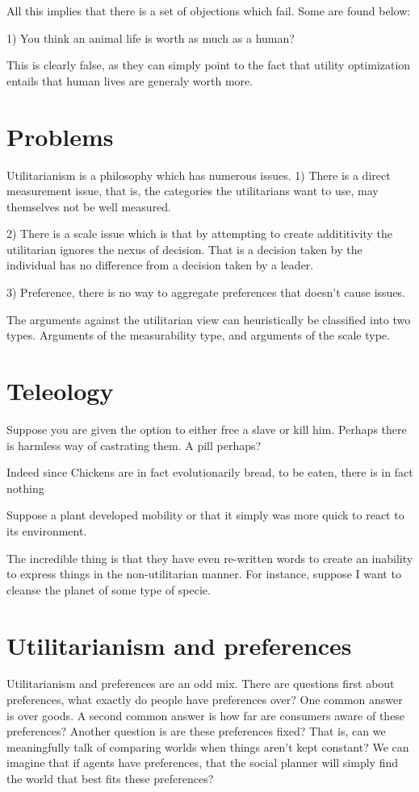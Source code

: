 \documentclass[12pt]{report}
\numberwithin{equation}{section}
\begin{document}
All this implies that there is a set of objections which fail. Some are found below:

1) You think an animal life is worth as much as a human? 

This is clearly false, as they can simply point to the fact that utility optimization entails that human lives are generaly worth more. 

\section{Problems}

Utilitarianism is a philosophy which has numerous issues. 
1) There is a direct measurement issue, that is, the categories the utilitarians want to use, may themselves not be well measured. 

2) There is a scale issue which is that by attempting to create addititivity the utilitarian ignores the nexus of decision. That is a decision taken by the individual has no difference from a decision taken by a leader. 

3) Preference, there is no way to aggregate preferences that doesn't cause issues. 

The arguments against the utilitarian view can heuristically be classified into two types. Arguments of the measurability type, and arguments of the scale type. 

\section{Teleology}
Suppose you are given the option to either free a slave or kill him. Perhaps there is harmless way of castrating them. A pill perhaps? 

Indeed since Chickens are in fact evolutionarily bread, to be eaten, there is in fact nothing 

Suppose a plant developed mobility or that it simply was more quick to react to its environment. 

The incredible thing is that they have even re-written words to create an inability to express things in the non-utilitarian manner. For instance, suppose I want to cleanse the planet of some type of specie. 


\section{Utilitarianism and preferences}

Utilitarianism and preferences are an odd mix. There are questions first about preferences, what exactly do people have preferences over? One common answer is over goods. A second common answer is how far are consumers aware of these preferences? Another question is are these preferences fixed? That is, can we meaningfully talk of comparing worlds when things aren't kept constant? We can imagine that if agents have preferences, that the social planner will simply find the world that best fits these preferences? 
\end{document}
